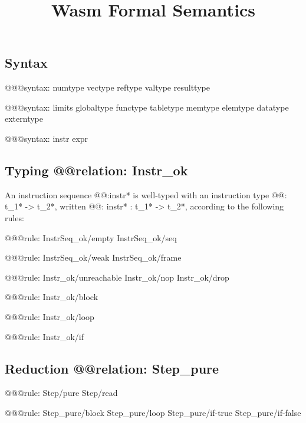 \documentclass[a4paper]{scrartcl}
\title{Wasm Formal Semantics}
\begin{document}
\small

\maketitle


\subsection*{Syntax}

@@@{syntax: numtype vectype reftype valtype resulttype}

@@@{syntax:
  limits
  globaltype
  functype
  tabletype
  memtype
  elemtype
  datatype
  externtype
}

@@@{syntax: instr expr}


\subsection*{Typing @@{relation: Instr_ok}}

An instruction sequence @@{:instr*} is well-typed with an instruction type @@{: t_1* -> t_2*}, written @@{: instr* : t_1* -> t_2*}, according to the following rules:

@@@{rule: InstrSeq_ok/empty InstrSeq_ok/seq}

@@@{rule: InstrSeq_ok/weak InstrSeq_ok/frame}


@@@{rule: Instr_ok/unreachable Instr_ok/nop Instr_ok/drop}

@@@{rule: Instr_ok/block}

@@@{rule: Instr_ok/loop}

@@@{rule: Instr_ok/if}


\subsection*{Reduction @@{relation: Step_pure}}

@@@{rule: Step/pure Step/read}

@@@{rule: Step_pure/block Step_pure/loop Step_pure/if-true Step_pure/if-false}
\end{document}
